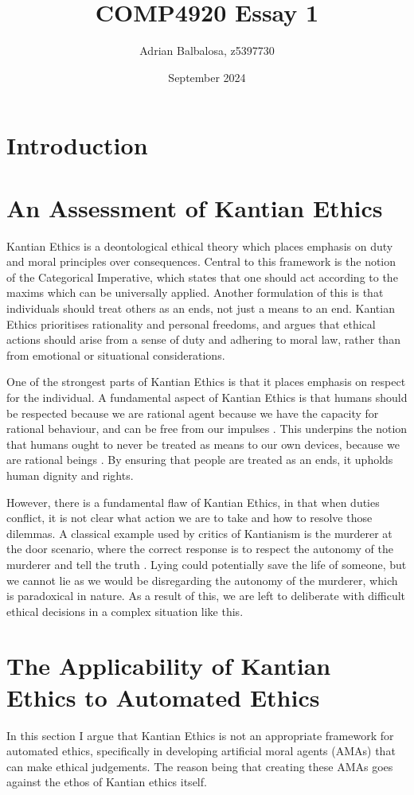 \documentclass{article}
\title{COMP4920 Essay 1}
\author{Adrian Balbalosa, z5397730}
\date{September 2024}
\begin{document}
\maketitle

\section{Introduction}

\section{An Assessment of Kantian Ethics}
Kantian Ethics is a deontological ethical theory which places emphasis on duty and
moral principles over consequences. Central to this framework is the notion of the
Categorical Imperative, which states that one should act according to the maxims which
can be universally applied. Another formulation of this is that individuals should treat
others as an ends, not just a means to an end. Kantian Ethics prioritises rationality and
personal freedoms, and argues that ethical actions should arise from a sense of duty and
adhering to moral law, rather than from emotional or situational considerations.

One of the strongest parts of Kantian Ethics is that it places emphasis on respect
for the individual. A fundamental aspect of Kantian Ethics is that 
humans should be respected because we are rational agent because we have the 
capacity for rational behaviour, and can be free from our impulses \parencite[p. 77]{bennet2015}.
This underpins the notion that humans ought to never be treated as means to our own devices,
because we are rational beings \parencite[p. 77]{bennet2015}. By ensuring that people are treated as
an ends, it upholds human dignity and rights.

However, there is a fundamental flaw of Kantian Ethics, in that when duties conflict, it is
not clear what action we are to take and how to resolve those dilemmas. A classical example used by
critics of Kantianism is the murderer at the door scenario, where the correct response is to respect
the autonomy of the murderer and tell the truth \parencite[p. 81]{bennet2015}. Lying could potentially 
save the life of someone, but we cannot lie as we would be disregarding the autonomy of the murderer, which
is paradoxical in nature. As a result of this, we are left to deliberate with difficult ethical decisions in
a complex situation like this.
\section{The Applicability of Kantian Ethics to Automated Ethics}
In this section I argue that Kantian Ethics is not an appropriate framework for automated ethics,
specifically in developing artificial moral agents (AMAs) that can make ethical judgements. 
The reason being that creating these AMAs goes against the ethos of Kantian ethics itself.
\end{document}
